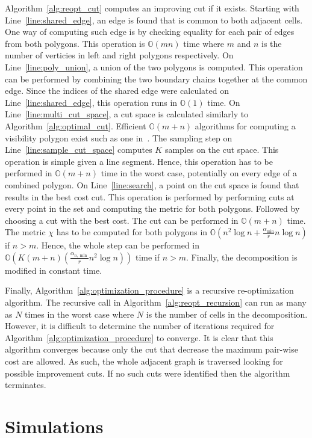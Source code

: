 \documentclass[../main.tex]{subfiles}
\begin{document}
Algorithm~\ref{alg:reopt_cut} computes an improving cut if it exists. Starting with Line~\ref{line:shared_edge}, an edge is found that is common to both adjacent cells. One way of computing such edge is by checking equality for each pair of edges from both polygons. This operation is $\mathbb{O}(mn)$ time where $m$ and $n$ is the number of verticies in left and right polygons respectively. On Line~\ref{line:poly_union}, a union of the two polygons is computed. This operation can be performed by combining the two boundary chains together at the common edge. Since the indices of the shared edge were calculated on Line~\ref{line:shared_edge}, this operation runs in $\mathbb{O}(1)$ time. On Line~\ref{line:multi_cut_space}, a cut space is calculated similarly to Algorithm~\ref{alg:optimal_cut}. Efficient $\mathbb{O}(m+n)$ algorithms for computing a visibility polygon exist such as one in~\cite{el1981linear}. The sampling step on Line~\ref{line:sample_cut_space} computes $K$ samples on the cut space. This operation is simple given a line segment. Hence, this operation has to be performed in $\mathbb{O}(m+n)$ time in the worst case, potentially on every edge of a combined polygon. On Line~\ref{line:search}, a point on the cut space is found that results in the best cost cut. This operation is performed by performing cuts at every point in the set and computing the metric for both polygons. Followed by choosing a cut with the best cost. The cut can be performed in $\mathbb{O}(m+n)$ time. The metric $\chi$ has to be computed for both polygons in $\mathbb{O}(n^2\log{n}+\frac{\alpha_{\min}}{r}n\log{n})$ if $n>m$. Hence, the whole step can be performed in $\mathbb{O}\left(K(m+n)(\frac{\alpha_{n,\min}}{r}n^2\log{n})\right)$ time if $n>m$. Finally, the decomposition is modified in constant time. 

Finally, Algorithm~\ref{alg:optimization_procedure} is a recursive re-optimization algorithm. The recursive call in Algorithm~\ref{alg:reopt_recursion} can run as many as $N$ times in the worst case where $N$ is the number of cells in the decomposition. However, it is difficult to determine the number of iterations required for Algorithm~\ref{alg:optimization_procedure} to converge. It is clear that this algorithm converges because only the cut that decrease the maximum pair-wise cost are allowed. As such, the whole adjacent graph is traversed looking for possible improvement cuts. If no such cuts were identified then the algorithm terminates.


\section{Simulations}
\label{section:multi_simulations}
\end{document}
